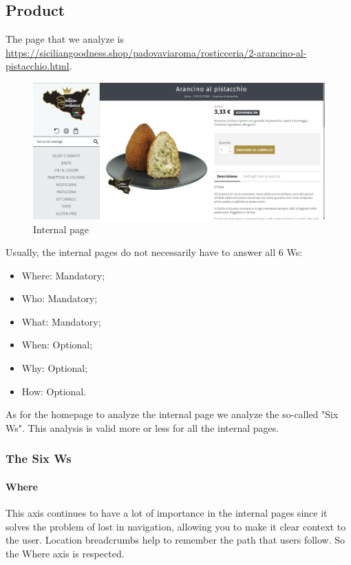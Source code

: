 \pagebreak

\subsection{Product}
The page that we analyze is \url{https://siciliangoodness.shop/padovaviaroma/rosticceria/2-arancino-al-pistacchio.html}.

\begin{figure}[H]
	\label{internalpage}
	\centering\includegraphics[width=12cm]{Img/internal.png}
	\caption{Internal page}
\end{figure}

Usually, the internal pages do not necessarily have to answer all 6 Ws:
\begin{itemize}
	\item Where: Mandatory;
	\item Who: Mandatory;
	\item What: Mandatory;
	\item When: Optional;
	\item Why: Optional;
	\item How: Optional.
\end{itemize}
As for the homepage to analyze the internal page we analyze the so-called "Six Ws".
This analysis is valid more or less for all the internal pages.

\subsubsection{The Six Ws}

\paragraph{Where}
This axis continues to have a lot of importance in the internal pages since it solves the problem of lost in navigation, allowing you to make it clear context to the user. Location breadcrumbs help to remember the path that users follow. So the Where axis is respected. 

